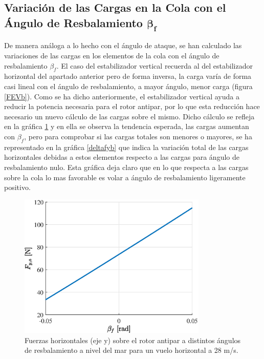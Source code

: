 \subsection{Variación de las Cargas en la Cola con el Ángulo de Resbalamiento $\boldsymbol{\beta_f}$}

De manera análoga a lo hecho con el ángulo de ataque, se han calculado las variaciones de las cargas en los elementos de la cola con el ángulo de resbalamiento $\beta_f$.
El caso del estabilizador vertical recuerda al del estabilizador horizontal del apartado anterior pero de forma inversa, la carga varía de forma casi lineal con el ángulo de resbalamiento, a mayor ángulo, menor carga (figura \ref{FEVb}). Como se ha dicho anteriormente, el estabilizador vertical ayuda a reducir la potencia necesaria para el rotor antipar, por lo que esta reducción hace necesario un nuevo cálculo de las cargas sobre el mismo. Dicho cálculo se refleja en la gráfica \ref{FAPb} y en ella se observa la tendencia esperada, las cargas aumentan con $\beta_f$, pero para comprobar si las cargas totales son menores o mayores, se ha representado en la gráfica \ref{deltafyb} que indica la variación total de las cargas horizontales debidas a estos elementos respecto a las cargas para ángulo de resbalamiento nulo.
Esta gráfica deja claro que en lo que respecta a las cargas sobre la cola lo mas favorable es volar a ángulo de resbalamiento ligeramente positivo.  

\begin{figure}
	\centering
	\includegraphics[width=90mm]{graficos/FAPb}
	\caption{Fuerzas horizontales (eje y) sobre el rotor antipar a distintos ángulos de resbalamiento a nivel del mar para un vuelo horizontal a 28 m/s.}
	\label{FAPb}
\end{figure}

